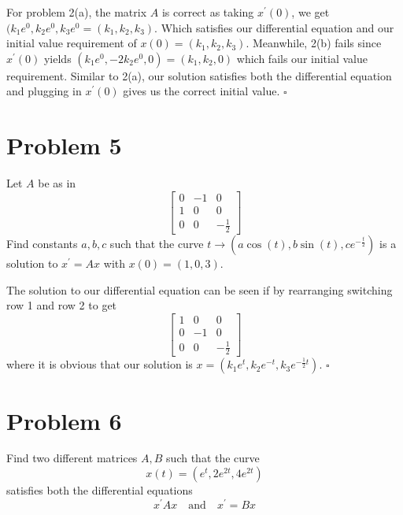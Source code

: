 \documentclass[11pt]{article}
\newenvironment{proof}{\noindent{\bf Proof.}}{\hfill $\square$\medskip}
\begin{document}
\begin{proof}
For problem 2(a), the matrix $A$ is correct as taking $x^{\prime}(0)$, we get $(k_{1}e^{0},k_{2}e^{0},k_{3}e^{0}=(k_{1},k_{2},k_{3})$.
Which satisfies our differential equation and our initial value requirement of $x(0)=(k_{1},k_{2},k_{3})$. 
Meanwhile, 2(b) fails since $x^{\prime}(0)$ yields $(k_{1}e^{0},-2k_{2}e^{0},0)=(k_{1},k_{2},0)$ which fails our initial value 
requirement. Similar to 2(a), our solution satisfies both the differential equation and plugging in $x^{\prime}(0)$ gives us 
the correct initial value.
\end{proof}

\section{Problem 5}
Let $A$ be as in
$$\begin{bmatrix}
    0&-1&0\\
    1&0&0\\
    0&0&-\frac{1}{2}
\end{bmatrix}$$
Find constants $a,b,c$ such that the curve $t\rightarrow (a\cos(t),b\sin(t),ce^{-\frac{t}{2}})$ is a solution to $x^{\prime}=Ax$
with $x(0)=(1,0,3)$.

\begin{proof}
The solution to our differential equation can be seen if by rearranging switching row 1 and row 2 to get
$$\begin{bmatrix}
    1&0&0\\
    0&-1&0\\
    0&0&-\frac{1}{2}
\end{bmatrix}$$
where it is obvious that our solution is $x=(k_{1}e^{t},k_{2}e^{-t},k_{3}e^{-\frac{1}{2}t})$.
\end{proof}

\newpage
\section{Problem 6}
Find two different matrices $A,B$ such that the curve
$$x(t)=(e^{t},2e^{2t},4e^{2t})$$
satisfies both the differential equations
$$x^{\prime}Ax\quad\text{and}\quad x^{\prime}=Bx$$
\end{document}
